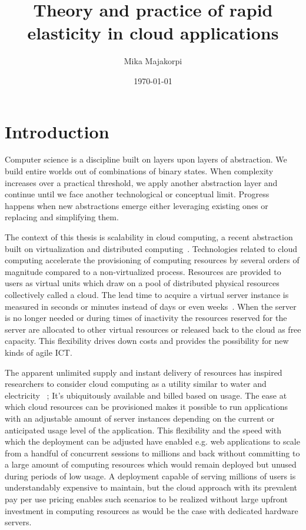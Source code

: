 \documentclass[english]{tktltiki2}
\title{Theory and practice of rapid elasticity in cloud applications}
\author{Mika Majakorpi}
\date{\today}
\theoremstyle{definition}
\theoremstyle{remark}
\begin{document}

\maketitle        %
\makeabstract     %

\tableofcontents  %
\newpage          %

\listoftodos
\newpage


\section{Introduction}

Computer science is a discipline built on layers upon layers of abstraction. We
build entire worlds out of combinations of binary states. When complexity
increases over a practical threshold, we apply another abstraction layer and
continue until we face another technological or conceptual limit. Progress
happens when new abstractions emerge either leveraging existing ones or
replacing and simplifying them.

The context of this thesis is scalability in cloud computing, a recent
abstraction built on virtualization and distributed computing~\cite{handbook}.
Technologies related to cloud computing accelerate the provisioning of computing
resources by several orders of magnitude compared to a non-virtualized process.
Resources are provided to users as virtual units which draw on a pool of
distributed physical resources collectively called a cloud. The lead time to
acquire a virtual server instance is measured in seconds or minutes instead of
days or even weeks~\cite{elasticsiteMarshall2010}. When the server is no longer
needed or during times of inactivity the resources reserved for the server are
allocated to other virtual resources or released back to the cloud as free
capacity. This flexibility drives down costs and provides the possibility for
new kinds of agile ICT.

The apparent unlimited supply and instant delivery of resources has inspired
researchers to consider cloud computing as a utility similar to water and
electricity ~\cite{Buyya2009a}; It’s ubiquitously available and billed based on
usage. The ease at which cloud resources can be provisioned makes it possible to
run applications with an adjustable amount of server instances depending on the
current or anticipated usage level of the application. This flexibility and the
speed with which the deployment can be adjusted have enabled e.g. web
applications to scale from a handful of concurrent sessions to millions
 and back without committing to a large amount of computing
resources which would remain deployed but unused during periods of low usage. A
deployment capable of serving millions of users is understandably expensive to
maintain, but the cloud approach with its prevalent pay per use pricing enables
such scenarios to be realized without large upfront investment in computing
resources as would be the case with dedicated hardware servers.
\end{document}
